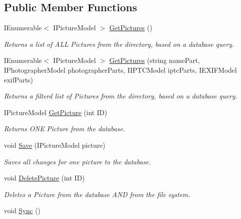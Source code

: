 \subsection*{Public Member Functions}
\begin{DoxyCompactItemize}
\item 
I\+Enumerable$<$ I\+Picture\+Model $>$ \mbox{\hyperlink{class_pic_d_b_1_1_layers_1_1_business_layer_acefa17fa294a25fc215b4f4804bc7a77}{Get\+Pictures}} ()
\begin{DoxyCompactList}\small\item\em Returns a list of A\+LL Pictures from the directory, based on a database query. \end{DoxyCompactList}\item 
I\+Enumerable$<$ I\+Picture\+Model $>$ \mbox{\hyperlink{class_pic_d_b_1_1_layers_1_1_business_layer_ab86c57b9679d4ab80db0a0cf6ce73daf}{Get\+Pictures}} (string name\+Part, I\+Photographer\+Model photographer\+Parts, I\+I\+P\+T\+C\+Model iptc\+Parts, I\+E\+X\+I\+F\+Model exif\+Parts)
\begin{DoxyCompactList}\small\item\em Returns a filterd list of Pictures from the directory, based on a database query. \end{DoxyCompactList}\item 
I\+Picture\+Model \mbox{\hyperlink{class_pic_d_b_1_1_layers_1_1_business_layer_a4e8d5716c33eb4fa81b6b186ec639f21}{Get\+Picture}} (int ID)
\begin{DoxyCompactList}\small\item\em Returns O\+NE Picture from the database. \end{DoxyCompactList}\item 
void \mbox{\hyperlink{class_pic_d_b_1_1_layers_1_1_business_layer_a602883f165f516bf2982370aecd1431d}{Save}} (I\+Picture\+Model picture)
\begin{DoxyCompactList}\small\item\em Saves all changes for one picture to the database. \end{DoxyCompactList}\item 
void \mbox{\hyperlink{class_pic_d_b_1_1_layers_1_1_business_layer_acdb10f071983ced2a68835ff464779ed}{Delete\+Picture}} (int ID)
\begin{DoxyCompactList}\small\item\em Deletes a Picture from the database A\+ND from the file system. \end{DoxyCompactList}\item 
void \mbox{\hyperlink{class_pic_d_b_1_1_layers_1_1_business_layer_aa09761d9c24caa93ad3e7f94ccf6379c}{Sync}} ()

\end{DoxyCompactItemize}
